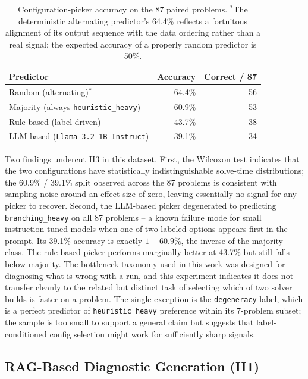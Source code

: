 \documentclass[11pt]{article}
\begin{document}
\begin{table}[h]
\centering
\begin{tabular}{lrr}
\toprule
\textbf{Predictor} & \textbf{Accuracy} & \textbf{Correct / 87} \\
\midrule
Random (alternating)$^*$                 & 64.4\% & 56 \\
Majority (always \texttt{heuristic\_heavy}) & 60.9\% & 53 \\
Rule-based (label-driven)                & 43.7\% & 38 \\
LLM-based (\texttt{Llama-3.2-1B-Instruct}) & 39.1\% & 34 \\
\bottomrule
\end{tabular}
\caption{Configuration-picker accuracy on the 87 paired problems. $^*$The deterministic alternating predictor's 64.4\% reflects a fortuitous alignment of its output sequence with the data ordering rather than a real signal; the expected accuracy of a properly random predictor is 50\%.}
\label{tab:h3_pickers}
\end{table}

Two findings undercut H3 in this dataset. First, the Wilcoxon test indicates that the two configurations have statistically indistinguishable solve-time distributions; the 60.9\% / 39.1\% split observed across the 87 problems is consistent with sampling noise around an effect size of zero, leaving essentially no signal for any picker to recover. Second, the LLM-based picker degenerated to predicting \texttt{branching\_heavy} on all 87 problems -- a known failure mode for small instruction-tuned models when one of two labeled options appears first in the prompt. Its 39.1\% accuracy is exactly $1 - 60.9\%$, the inverse of the majority class. The rule-based picker performs marginally better at 43.7\% but still falls below majority. The bottleneck taxonomy used in this work was designed for diagnosing what is wrong with a run, and this experiment indicates it does not transfer cleanly to the related but distinct task of selecting which of two solver builds is faster on a problem. The single exception is the \texttt{degeneracy} label, which is a perfect predictor of \texttt{heuristic\_heavy} preference within its 7-problem subset; the sample is too small to support a general claim but suggests that label-conditioned config selection might work for sufficiently sharp signals.

\subsection{RAG-Based Diagnostic Generation (H1)}
\end{document}
